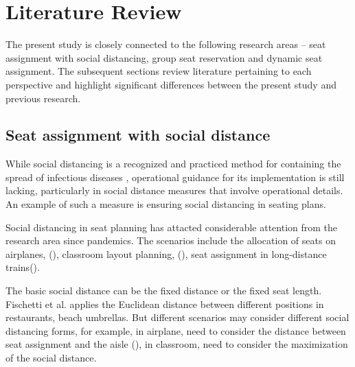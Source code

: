 \section{Literature Review}

The present study is closely connected to the following research areas -- seat assignment with social distancing, group seat reservation and dynamic seat assignment. The subsequent sections review literature pertaining to each perspective and highlight significant differences between the present study and previous research.

\subsection{Seat assignment with social distance}
While social distancing is a recognized and practiced method for containing the spread of infectious diseases \cite{moosa2020effectiveness}, operational guidance for its implementation is still lacking, particularly in social distance measures that involve operational details. An example of such a measure is ensuring social distancing in seating plans.


Social distancing in seat planning has attacted considerable attention from the research area since pandemics. The scenarios include the allocation of seats on airplanes, (\cite{ghorbani2020model}), classroom layout planning, (\cite{bortolete2022support}), seat assignment in long-distance trains(\cite{haque2022optimization}). 

The basic social distance can be the fixed distance or the fixed seat length. Fischetti et al. \cite{fischetti2021safe} applies the Euclidean distance between different positions in restaurants, beach umbrellas. But different scenarios may consider different social distancing forms, for example, in airplane, need to consider the distance between seat assignment and the aisle (\cite{salari2022social}), in classroom, need to consider the maximization of the social distance.







